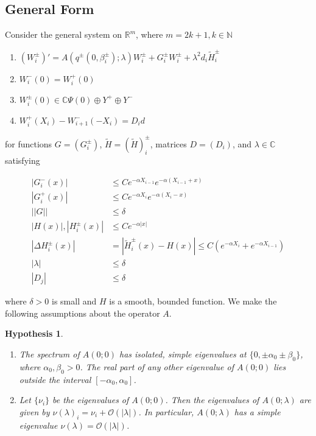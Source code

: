 \documentclass[12pt]{article}
\def\R{{\mathbb R}}
\def\N{{\mathbb N}}
\def\C{{\mathbb C}}
\newtheorem{hypothesis}{Hypothesis}
\begin{document}
\subsection{General Form}

Consider the general system on $\R^m$, where $m = 2k + 1, k \in \N$

\begin{enumerate}
\item $(W_i^\pm)' = A(q^\pm(0, \beta_i^\pm); \lambda) W_i^\pm + G_i^\pm W_i^\pm + \lambda^2 d_i \tilde{H}_i^\pm$
\item $W_i^-(0) = W_i^+(0)$
\item $W_i^\pm(0) \in \C \Psi(0) \oplus Y^+ \oplus Y^- $
\item $W_i^+(X_i) - W_{i+1}^-(-X_i) = D_i d$
\end{enumerate}

for functions $G = (G_i^\pm)$, $\tilde{H} = (\tilde{H})_i^\pm$, matrices $D = (D_i)$, and $\lambda \in \C$ satisfying 

\begin{align}
|G_i^-(x)| &\leq C e^{-\alpha X_{i-1}} e^{-\alpha(X_{i-1} + x) } \\
|G_i^+(x)| &\leq C e^{-\alpha X_i} e^{-\alpha(X_i - x) } \\
||G|| &\leq \delta \\
|H(x)|, |H_i^\pm(x)| &\leq C e^{-\alpha |x|} \\
|\Delta H_i^\pm(x)| &= |\tilde{H}_i^\pm(x) - H(x)| \leq C( e^{-\alpha X_i} + e^{-\alpha X_{i-1}}) \\
|\lambda| &\leq \delta \\
|D_j| &\leq \delta
\end{align}

where $\delta > 0$ is small and $H$ is a smooth, bounded function. We make the following assumptions about the operator $A$.

\begin{hypothesis}\label{Aspectrumhyp}
\begin{enumerate}
	\item The spectrum of $A(0; 0)$ has isolated, simple eigenvalues at $\{ 0, \pm \alpha_0 \pm \beta_0 \}$, where $\alpha_0, \beta_0 > 0$. The real part of any other eigenvalue of $A(0; 0)$ lies outside the interval $[-\alpha_0, \alpha_0]$.
	\item Let $\{\nu_i\}$ be the eigenvalues of $A(0; 0)$. Then the eigenvalues of $A(0; \lambda)$ are given by $\nu(\lambda)_i = \nu_i + \mathcal{O}(|\lambda|)$. In particular, $A(0; \lambda)$ has a simple eigenvalue $\nu(\lambda) = \mathcal{O}(|\lambda|)$.
\end{enumerate}
\end{hypothesis}
\end{document}
